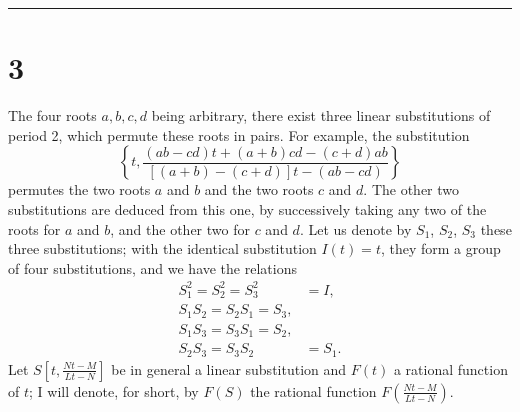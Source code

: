 \documentclass[11pt]{article}
\begin{document}
\hrule

\bigskip

\section*{3}
The four roots $a, b, c, d$ being arbitrary, there exist three linear substitutions of period 2, which permute these roots in pairs. For example, the substitution
\begin{equation*}
\left\{t,\frac{(ab-cd)t+(a+b)cd-(c+d)ab}{[(a+b)-(c+d)]t-(ab-cd)}\right\}
\end{equation*}
permutes the two roots $a$ and $b$ and the two roots $c$ and $d$. The other two substitutions are deduced from this one, by successively taking any two of the roots for $a$ and $b$, and the other two for $c$ and $d$. Let us denote by $S_{1}$, $S_{2}$, $S_{3}$ these three substitutions; with the identical substitution $I(t)=t$, they form a group of four substitutions, and we have the relations
\begin{align*}
S_{1}^{2}=S_{2}^{2}=S_{3}^{2}&=I, \\
S_{1}S_{2}=S_{2}S_{1}=S_{3}, \\
S_{1}S_{3}=S_{3}S_{1}=S_{2}, \\
S_{2}S_{3}=S_{3}S_{2}&=S_{1}.
\end{align*}
Let $S\left[t,\frac{Nt-M}{Lt-N}\right]$ be in general a linear substitution and $F(t)$ a rational function of $t$; I will denote, for short, by $F(S)$ the rational function $F\left(\frac{Nt-M}{Lt-N}\right)$.
\end{document}

